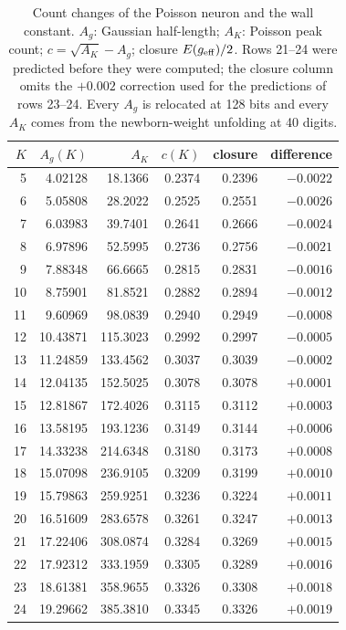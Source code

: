 \documentclass[journal]{IEEEtran}
\begin{document}
\begin{table}[t]\centering
\caption{Count changes of the Poisson neuron and the wall constant. $A_g$: Gaussian half-length; $A_K$: Poisson peak count;
$c = \sqrt{A_K} - A_g$; closure $E(g_{\rm eff})/2$. Rows 21--24 were predicted before they were computed; the closure column omits
the $+0.002$ correction used for the predictions of rows 23--24. Every $A_g$ is relocated at 128 bits and every $A_K$ comes from the
newborn-weight unfolding at 40 digits.}\label{tab:trans}
\footnotesize\setlength{\tabcolsep}{4pt}
\begin{tabular}{@{}rrrrrr@{}}\toprule
$K$ & $A_g(K)$ & $A_K$ & $c(K)$ & closure & difference\\\midrule
5 & 4.02128 & 18.1366 & 0.2374 & 0.2396 & $-0.0022$\\
6 & 5.05808 & 28.2022 & 0.2525 & 0.2551 & $-0.0026$\\
7 & 6.03983 & 39.7401 & 0.2641 & 0.2666 & $-0.0024$\\
8 & 6.97896 & 52.5995 & 0.2736 & 0.2756 & $-0.0021$\\
9 & 7.88348 & 66.6665 & 0.2815 & 0.2831 & $-0.0016$\\
10 & 8.75901 & 81.8521 & 0.2882 & 0.2894 & $-0.0012$\\
11 & 9.60969 & 98.0839 & 0.2940 & 0.2949 & $-0.0008$\\
12 & 10.43871 & 115.3023 & 0.2992 & 0.2997 & $-0.0005$\\
13 & 11.24859 & 133.4562 & 0.3037 & 0.3039 & $-0.0002$\\
14 & 12.04135 & 152.5025 & 0.3078 & 0.3078 & $+0.0001$\\
15 & 12.81867 & 172.4026 & 0.3115 & 0.3112 & $+0.0003$\\
16 & 13.58195 & 193.1236 & 0.3149 & 0.3144 & $+0.0006$\\
17 & 14.33238 & 214.6348 & 0.3180 & 0.3173 & $+0.0008$\\
18 & 15.07098 & 236.9105 & 0.3209 & 0.3199 & $+0.0010$\\
19 & 15.79863 & 259.9251 & 0.3236 & 0.3224 & $+0.0011$\\
20 & 16.51609 & 283.6578 & 0.3261 & 0.3247 & $+0.0013$\\
21 & 17.22406 & 308.0874 & 0.3284 & 0.3269 & $+0.0015$\\
22 & 17.92312 & 333.1959 & 0.3305 & 0.3289 & $+0.0016$\\
23 & 18.61381 & 358.9655 & 0.3326 & 0.3308 & $+0.0018$\\
24 & 19.29662 & 385.3810 & 0.3345 & 0.3326 & $+0.0019$\\
\bottomrule\end{tabular}
\end{table}
\end{document}
